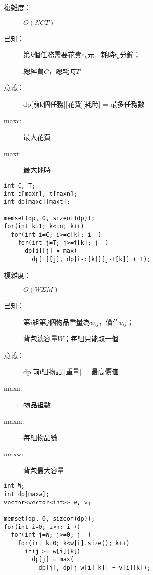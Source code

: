 \begin{center}
  \underline{    }
\end{center}
\begin{description}
  \item[複雜度：] $O(NCT)$
  \item[已知：] 第$k$個任務需要花費$c_k$元，耗時$t_k$分鐘；\par
               總經費$C$，總耗時$T$
  \item[意義：] dp[前k個任務][花費][耗時] = 最多任務數
  \item[maxc:] 最大花費
  \item[maxt:] 最大耗時
\end{description}
\begin{lstlisting}
int C, T;
int c[maxn], t[maxn];
int dp[maxc][maxt];

memset(dp, 0, sizeof(dp));
for(int k=1; k<=n; k++)
  for(int i=C; i>=c[k]; i--)
    for(int j=T; j>=t[k]; j--)
      dp[i][j] = max(
        dp[i][j], dp[i-c[k]][j-t[k]] + 1);
\end{lstlisting}

\begin{center}
  \underline{    }
\end{center}
\begin{description}
  \item[複雜度：] $O(W\Sigma M)$
  \item[已知：] 第$i$組第$j$個物品重量為$w_{ij}$，價值$v_{ij}$；\par
               背包總容量$W$；每組只能取一個
  \item[意義：] dp[前i組物品][重量] = 最高價值
  \item[maxn:] 物品組數
  \item[maxm:] 每組物品數
  \item[maxw:] 背包最大容量
\end{description}
\begin{lstlisting}
int W;
int dp[maxw];
vector<vector<int>> w, v;

memset(dp, 0, sizeof(dp));
for(int i=0; i<n; i++)
  for(int j=W; j>=0; j--)
    for(int k=0; k<w[i].size(); k++)
      if(j >= w[i][k])
        dp[j] = max(
          dp[j], dp[j-w[i][k]] + v[i][k]);
\end{lstlisting}

\begin{center}
  \underline{    }
\end{center}
\begin{lstlisting}

\end{lstlisting}

\begin{center}
  \underline{    }
\end{center}
\begin{lstlisting}

\end{lstlisting}